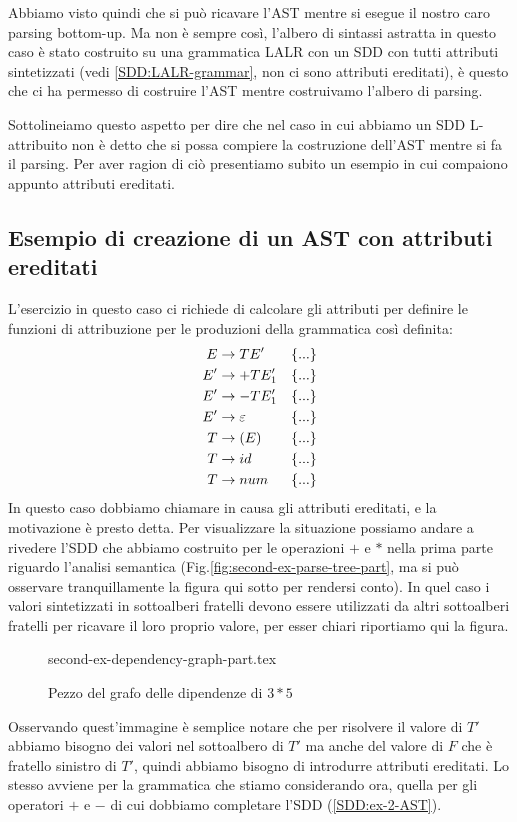 \documentclass[class=book, crop=false, oneside, 12pt]{standalone}
\begin{document}
Abbiamo visto quindi che si può ricavare l'AST mentre si esegue il nostro caro parsing bottom-up.
Ma non è sempre così, l'albero di sintassi astratta in questo caso è stato costruito su una grammatica LALR con un SDD con tutti attributi sintetizzati (vedi \ref{SDD:LALR-grammar}, non ci sono attributi ereditati), è questo che ci ha permesso di costruire l'AST mentre costruivamo l'albero di parsing.

Sottolineiamo questo aspetto per dire che nel caso in cui abbiamo un SDD L-attribuito non è detto che si possa compiere la costruzione dell'AST mentre si fa il parsing. Per aver ragion di ciò presentiamo subito un esempio in cui compaiono appunto attributi ereditati.

\subsection{Esempio di creazione di un AST con attributi ereditati}
L'esercizio in questo caso ci richiede di calcolare gli attributi per definire le funzioni di attribuzione per le produzioni della grammatica così definita:
\begin{align}
    \label{SDD:ex-2-AST}
    E &\to TE' & & \{...\} \\ 
    E'&\to +TE_1' & & \{...\} \notag \nonumber \\ 
    E'&\to -TE_1' & & \{...\} \notag \nonumber \\ 
    E'&\to \varepsilon & & \{...\} \notag \nonumber \\ 
    T &\to (E) & & \{...\} \notag \nonumber \\ 
    T &\to id & & \{...\} \notag \nonumber \\ 
    T &\to num & & \{...\} \notag \nonumber
\end{align}
In questo caso dobbiamo chiamare in causa gli attributi ereditati, e la motivazione è presto detta.
Per visualizzare la situazione possiamo andare a rivedere l'SDD che abbiamo costruito per le operazioni \(+\) e \(*\) nella prima parte riguardo l'analisi semantica (Fig.\ref{fig:second-ex-parse-tree-part}, ma si può osservare tranquillamente la figura  qui sotto per rendersi conto).
In quel caso i valori sintetizzati in sottoalberi fratelli devono essere utilizzati da altri sottoalberi fratelli per ricavare il loro proprio valore, per esser chiari riportiamo qui la figura.
\begin{figure}[H]
    \centering
    {second-ex-dependency-graph-part.tex}
    \caption{Pezzo del grafo delle dipendenze di \(3*5\)}
\end{figure}
Osservando quest'immagine è semplice notare che per risolvere il valore di \(T'\) abbiamo bisogno dei valori nel sottoalbero di \(T'\) ma anche del valore di \(F\) che è fratello sinistro di \(T'\), quindi abbiamo bisogno di introdurre attributi ereditati.
Lo stesso avviene per la grammatica che stiamo considerando ora, quella per gli operatori \(+\) e \(-\) di cui dobbiamo completare l'SDD (\ref{SDD:ex-2-AST}).
\end{document}
